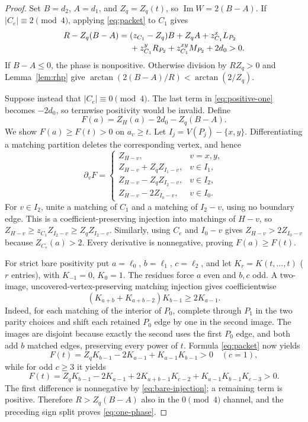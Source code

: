 \documentclass[11pt]{article}
\theoremstyle{remark}
\begin{document}
\begin{proof}
Set $B=d_2$, $A=d_1$, and $Z_q=Z_q(t)$, so
$\operatorname{Im}W=2(B-A)$.  If $|C_e|\equiv2\pmod4$, applying
\eqref{eq:packet} to $C_1$ gives
\begin{align}\label{eq:positive-one}
 R-Z_q(B-A)={}&(z_{C_1}-Z_q)B+Z_qA+z_{C_1}^xL_{P_2}\notag\\
 &+z_{C_1}^yR_{P_2}+z_{C_1}^{xy}M_{P_2}+2d_0>0.
\end{align}
If $B-A\leq0$, the phase is nonpositive.  Otherwise division by $RZ_q>0$
and Lemma~\ref{lem:rhp} give
$\arctan(2(B-A)/R)<\arctan(2/Z_q)$.

Suppose instead that $|C_e|\equiv0\pmod4$.  The last term in
\eqref{eq:positive-one} becomes $-2d_0$, so termwise positivity would be
invalid.  Define
\[
 F(a)=Z_H(a)-2d_0-Z_q(B-A).
\]
We show $F(a)\geq F(t)>0$ on $a_v\geq t$.  Let
$I_j=V(P_j)-\{x,y\}$.  Differentiating a matching partition deletes the
corresponding vertex, and hence
\[
 \partial_vF=\begin{cases}
 Z_{H-v},&v=x,y,\\
 Z_{H-v}+Z_qZ_{I_1-v},&v\in I_1,\\
 Z_{H-v}-Z_qZ_{I_2-v},&v\in I_2,\\
 Z_{H-v}-2Z_{I_0-v},&v\in I_0.
 \end{cases}
\]
For $v\in I_2$, unite a matching of $C_1$ and a matching of $I_2-v$, using
no boundary edge.  This is a coefficient-preserving injection into matchings
of $H-v$, so
$Z_{H-v}\geq z_{C_1}Z_{I_2-v}\geq Z_qZ_{I_2-v}$.  Similarly, using $C_e$ and
$I_0-v$ gives $Z_{H-v}>2Z_{I_0-v}$ because $Z_{C_e}(a)>2$.  Every derivative
is nonnegative, proving $F(a)\geq F(t)$.

For strict bare positivity put $a=\ell_0$, $b=\ell_1$, $c=\ell_2$, and let
$K_r=K(t,\ldots,t)$ ($r$ entries), with $K_{-1}=0$, $K_0=1$.  The residues
force $a$ even and $b,c$ odd.  A two-image, uncovered-vertex-preserving
matching injection gives coefficientwise
\begin{equation}\label{eq:bare-injection}
 (K_{a+b}+K_{a+b-2})K_{b-1}\geq2K_{a-1}.
\end{equation}
Indeed, for each matching of the interior of $P_0$, complete through $P_1$ in
the two parity choices and shift each retained $P_0$ edge by one in the second
image.  The images are disjoint because exactly the second uses the first
$P_0$ edge, and both add $b$ matched edges, preserving every power of $t$.
Formula \eqref{eq:packet} now yields
\[
 F(t)=Z_qK_{b-1}-2K_{a-1}+K_{a-1}K_{b-1}>0\quad(c=1),
\]
while for odd $c\geq3$ it yields
\[
 F(t)=Z_qK_{b-1}-2K_{a-1}
 +2K_{a+b-1}K_{c-2}+K_{a-1}K_{b-1}K_{c-3}>0.
\]
The first difference is nonnegative by \eqref{eq:bare-injection}; a remaining
term is positive.  Therefore $R>Z_q(B-A)$ also in the $0\pmod4$ channel, and
the preceding sign split proves \eqref{eq:one-phase}.
\end{proof}
\end{document}

